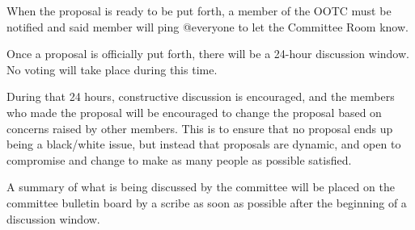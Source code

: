 \begin{deepEnumerate}
\begin{deepEnumerate}
    \end{deepEnumerate}
    \item When the proposal is ready to be put forth, a member of the OOTC must be notified and said member will ping @everyone to let the Committee Room know.
    \item Once a proposal is officially put forth, there will be a 24-hour discussion window. No voting will take place during this time.
    \begin{deepEnumerate}
        \item During that 24 hours, constructive discussion is encouraged, and the members who made the proposal will be encouraged to change the proposal based on concerns
        raised by other members. This is to ensure that no proposal ends up being a black/white issue, but instead that proposals are dynamic, and open to compromise 
        and change to make as many people as possible satisfied.
        \item A summary of what is being discussed by the committee will be placed on the committee bulletin board by a scribe as soon as possible 
        after the beginning of a discussion window.
    \end{deepEnumerate}
\end{deepEnumerate}

